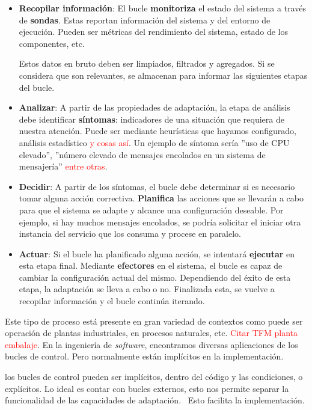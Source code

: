 \begin{itemize}
  \item \textbf{Recopilar información}: El bucle \textbf{monitoriza} el estado del sistema a través de \textbf{sondas}. Estas reportan información del sistema y del entorno de ejecución. Pueden ser métricas del rendimiento del sistema, estado de los componentes, etc.

  Estos datos en bruto deben ser limpiados, filtrados y agregados. Si se considera que son relevantes, se almacenan para informar las siguientes etapas del bucle.

  \item \textbf{Analizar}: A partir de las propiedades de adaptación, la etapa de análisis debe identificar \textbf{síntomas}: indicadores de una situación que requiera de nuestra atención. Puede ser mediante heurísticas que hayamos configurado, análisis estadístico \textcolor{red}{y cosas así}. Un ejemplo de síntoma sería ''uso de CPU elevado'', ''número elevado de mensajes encolados en un sistema de mensajería'' \textcolor{red}{entre otras}.

  \item \textbf{Decidir}: A partir de los síntomas, el bucle debe determinar si es necesario tomar alguna acción correctiva. \textbf{Planifica} las acciones que se llevarán a cabo para que el sistema se adapte y alcance una configuración deseable. Por ejemplo, si hay muchos mensajes encolados, se podría solicitar el iniciar otra instancia del servicio que los consuma y procese en paralelo.

  \item \textbf{Actuar}: Si el bucle ha planificado alguna acción, se intentará \textbf{ejecutar} en esta etapa final. Mediante \textbf{efectores} en el sistema, el bucle es capaz de cambiar la configuración actual del mismo. Dependiendo del éxito de esta etapa, la adaptación se lleva a cabo o no. Finalizada esta, se vuelve a recopilar información y el bucle continúa iterando.
\end{itemize}

Este tipo de proceso está presente en gran variedad de contextos como puede ser operación de plantas industriales, en procesos naturales, etc. \textcolor{red}{Citar TFM planta embalaje}. En la ingeniería de \emph{software}, encontramos diversas aplicaciones de los bucles de control. Pero normalmente están implícitos en la implementación. \cite{brunEngineeringSelfAdaptiveSystems2009}

los bucles de control pueden ser implícitos, dentro del código y las condiciones, o explícitos. \cite{brunEngineeringSelfAdaptiveSystems2009} Lo ideal es contar con bucles externos, esto nos permite separar la funcionalidad de las capacidades de adaptación. \ Esto facilita la implementación.

